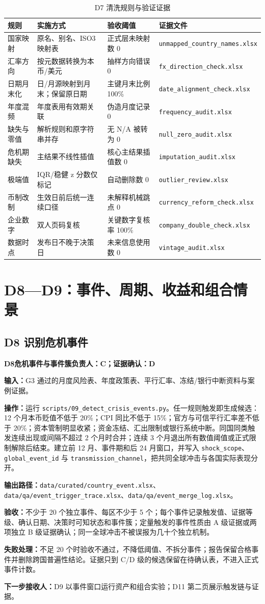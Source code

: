 \documentclass[UTF8,fontset=windows,12pt,openany]{ctexbook}
\newcommand{\Field}[1]{{\small\nolinkurl{#1}}}
\newcommand{\File}[1]{{\small\begingroup\urlstyle{same}\nolinkurl{#1}\endgroup}}
\newcommand{\StepTitle}[3]{%
  \noindent\colorbox{DeepNavy}{\parbox{0.965\textwidth}{\color{white}\Large\bfseries #1\quad #2\hfill\normalsize #3}}\par\medskip
}
\newcommand{\CardRow}[2]{\noindent\textbf{#1：}#2\par}
\begin{document}
\begin{longtable}{p{3.3cm}p{3.2cm}p{3.0cm}p{3.8cm}}
\caption{D7 清洗规则与验证证据}\label{tab:clean-rules}\\
\toprule
\textbf{规则} & \textbf{实施方式} & \textbf{验收阈值} & \textbf{证据文件}\\
\midrule
国家映射 & 原名、别名、ISO3 映射表 & 正式层未映射数 0 & \File{unmapped_country_names.xlsx}\\
汇率方向 & 按元数据转换为本币/美元 & 抽样方向错误 0 & \File{fx_direction_check.xlsx}\\
日期月末化 & 日/月源映射到月末；保留原日期 & 主键月末比例 100\% & \File{date_alignment_check.xlsx}\\
年度混频 & 年度表用有效期关联 & 伪造月度记录 0 & \File{frequency_audit.xlsx}\\
缺失与零值 & 解析规则和原字符串并存 & 无 N/A 被转为 0 & \File{null_zero_audit.xlsx}\\
危机期缺失 & 主结果不线性插值 & 核心主结果插值数 0 & \File{imputation_audit.xlsx}\\
极端值 & IQR/稳健 z 分数仅标记 & 自动删除数 0 & \File{outlier_review.xlsx}\\
币制改制 & 生效日前后统一连续口径 & 未解释机械跳点 0 & \File{currency_reform_check.xlsx}\\
企业数字 & 双人页码复核 & 关键数字复核率 100\% & \File{company_double_check.xlsx}\\
数据时点 & 发布日不晚于决策日 & 未来信息使用数 0 & \File{vintage_audit.xlsx}\\
\bottomrule
\end{longtable}

\chapter{D8—D9：事件、周期、收益和组合情景}

\section{D8 识别危机事件}
\StepTitle{D8}{危机事件与事件簇}{负责人：C；证据确认：D}
\CardRow{输入}{G3 通过的月度风险表、年度政策表、平行汇率、冻结/银行中断资料与案例证据。}
\CardRow{操作}{运行 \File{scripts/09_detect_crisis_events.py}。任一规则触发即生成候选：12 个月本币贬值不低于 20\%；CPI 同比不低于 15\%；官方与可信平行汇率差不低于 20\%；资本管制明显收紧；资金冻结、汇出限制或银行系统中断。同国同类触发连续出现或间隔不超过 2 个月时合并；连续 3 个月退出所有数值阈值或正式限制解除后结束。建立前 12 月、事件期和后 24 月窗口，并写入 \Field{shock_scope}、\Field{global_event_id} 与 \Field{transmission_channel}，把共同全球冲击与各国实际表现分开。}
\CardRow{输出路径}{\File{data/curated/country_event.xlsx}、\File{data/qa/event_trigger_trace.xlsx}、\File{data/qa/event_merge_log.xlsx}。}
\CardRow{验收}{不少于 20 个独立事件、每区不少于 5 个；每个事件记录触发值、证据等级、确认日期、决策时可知状态和事件簇；定量触发的事件性质由 A 级证据或两项独立 B 级证据确认；同一全球冲击不被误报为几十个独立机制。}
\CardRow{失败处理}{不足 20 个时验收不通过，不降低阈值、不拆分事件；报告保留合格事件并删除跨国普遍性结论。证据只到 C/D 级的候选保留在待确认表，不进入正式事件计数。}
\CardRow{下一步接收人}{D9 以事件窗口运行资产和组合实验；D11 第二页展示触发链与证据。}
\end{document}
